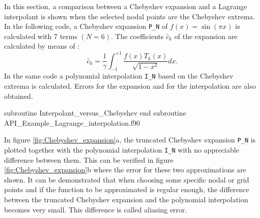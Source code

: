 In this section, a comparison between a Chebyshev expansion and a Lagrange interpolant is shown when the selected nodal points are the Chebyshev extrema.
In the following code, a Chebyshev expansion \verb|P_N| of $f(x) = \sin( \pi x ) $ is calculated with 7 terms $(N=6)$. 
The coefficients $\hat{c}_k $ of the expansion are calculated by means of : 
$$
   \hat{c}_k = \frac{1}{\gamma} \int_{-1}^{+1} \frac{ f(x) T_k(x) } { \sqrt{1-x^2} } dx. 
$$
In the same code a polynomial interpolation \verb|I_N| based on the Chebyshev extrema is calculated. 
Errors for the expansion and for the interpolation are also obtained.  

\newpage      

\vspace{0.5cm} 
         {subroutine Interpolant_versus_Chebyshev}
         {end subroutine}
         {API_Example_Lagrange_interpolation.f90}
 
In figure \ref{fig:Chebyshev_expansion}a,  the truncated Chebyshev expansion \verb|P_N| is plotted together with the polynomial interpolation \verb|I_N| 
with no appreciable difference between them. This can be verified in figure \ref{fig:Chebyshev_expansion}b where the error for these two approximations are shown. It can be demonstrated that when choosing some specific nodal or grid points and if the function to be approximated is regular enough, the difference between the truncated Chebyshev expansion and the polynomial interpolation becomes very small. This difference is called aliasing error.

       